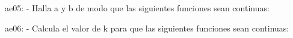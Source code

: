 \documentclass[spanish, 11pt]{exam}
\begin{document}
\begin{questions}
\begin{multicols}{3}
\begin{parts}
        \end{parts}
        \end{multicols}
        \question ae05:  - Halla a y b de modo que las siguientes funciones sean continuas:

        \begin{multicols}{2}
        \end{multicols}
        \question ae06:  - Calcula el valor de k para que las siguientes funciones sean continuas:


\end{questions}
\end{document}
